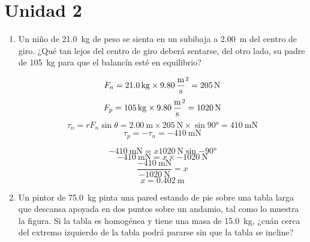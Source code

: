 \documentclass[Análisis.root.tex]{subfiles}
\begin{document}
\section{Unidad 2}

\begin{enumerate}
  \item Un niño de \SI{21,0}{\kilogram} de peso se sienta en un subibaja a \SI{2,00}{\meter} del centro de giro. ¿Qué tan lejos del centro de giro deberá sentarse, del otro lado, su padre de \SI{105}{\kilogram} para que el balancín esté en equilibrio?

        \begin{multicols}{2}
          \begin{center}
          \end{center}

          \[
            F_n=\SI{21,0}{\kilogram}\times\SI{9,80}{\meter\over\second\squared}
            =\SI{205}{\newton}
          \]
          \[
            F_p=\SI{105}{\kilogram}\times\SI{9,80}{\meter\over\second\squared}
            =\SI{1020}{\newton}
          \]
          \[
            \tau_n=rF_n\sin{\theta}
            =\SI{2,00}{\meter}\times\SI{205}{\newton}\times\sin{\ang{90}}
            =\SI{410}{\meter\newton}
          \]
          \[\tau_p=-\tau_n=\SI{-410}{\meter\newton}\]

          \[\SI{-410}{\meter\newton}=x\SI{1020}{\newton}\sin{\ang{-90}}\]
          \[\SI{-410}{\meter\newton}=x\times\SI{-1020}{\newton}\]
          \[\frac{\SI{-410}{\meter\newton}}{\SI{-1020}{\newton}}=x\]
          \[x=\boxed{\SI{0.402}{\meter}}\]
        \end{multicols}

  \item Un pintor de \SI{75,0}{\kilogram} pinta una pared estando de pie sobre una tabla larga que descansa apoyada en dos puntos sobre un andamio, tal como lo muestra la figura. Si la tabla es homogénea y tiene una masa de \SI{15,0}{\kilogram}, ¿cuán cerca del extremo izquierdo de la tabla podrá pararse sin que la tabla se incline?


\end{enumerate}
\end{document}
